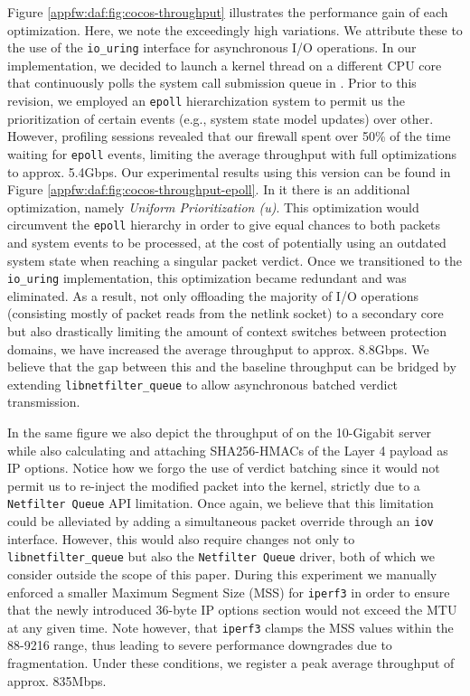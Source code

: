 

Figure \ref{appfw:daf:fig:cocos-throughput} illustrates the performance gain of each optimization. Here, we note the exceedingly high variations. We attribute these to the use of the \texttt{io\_uring} interface for asynchronous I/O operations. In our implementation, we decided to launch a kernel thread on a different CPU core that continuously polls the system call submission queue in \daf{}. Prior to this revision, we employed an \texttt{epoll} hierarchization system to permit us the prioritization of certain events (e.g., system state model updates) over other. However, profiling sessions revealed that our firewall spent over 50\% of the time waiting for \texttt{epoll} events, limiting the average throughput with full optimizations to approx. 5.4Gbps. Our experimental results using this version can be found in Figure \ref{appfw:daf:fig:cocos-throughput-epoll}. In it there is an additional optimization, namely \textit{Uniform Prioritization (u)}. This optimization would circumvent the \texttt{epoll} hierarchy in order to give equal chances to both packets and system events to be processed, at the cost of potentially using an outdated system state when reaching a singular packet verdict. Once we transitioned to the \texttt{io\_uring} implementation, this optimization became redundant and was eliminated. As a result, not only offloading the majority of I/O operations (consisting mostly of packet reads from the netlink socket) to a secondary core but also drastically limiting the amount of context switches between protection domains, we have increased the average throughput to approx. 8.8Gbps. We believe that the gap between this and the baseline throughput can be bridged by extending \texttt{libnetfilter\_queue} to allow asynchronous batched verdict transmission.



In the same figure we also depict the throughput of \daf{} on the 10-Gigabit server while also calculating and attaching SHA256-HMACs of the Layer 4 payload as IP options. Notice how we forgo the use of verdict batching since it would not permit us to re-inject the modified packet into the kernel, strictly due to a \texttt{Netfilter Queue} API limitation. Once again, we believe that this limitation could be alleviated by adding a simultaneous packet override through an \texttt{iov} interface. However, this would also require changes not only to \texttt{libnetfilter\_queue} but also the \texttt{Netfilter Queue} driver, both of which we consider outside the scope of this paper. During this experiment we manually enforced a smaller Maximum Segment Size (MSS) for \texttt{iperf3} in order to ensure that the newly introduced 36-byte IP options section would not exceed the MTU at any given time. Note however, that \texttt{iperf3} clamps the MSS values within the 88-9216 range, thus leading to severe performance downgrades due to fragmentation. Under these conditions, we register a peak average throughput of approx. 835Mbps.

